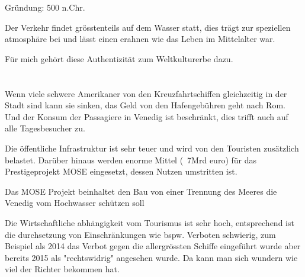 \documentclass[12pt, letterpaper, twoside]{article}
\begin{document}
\begin{flushleft}
Gründung: 500 n.Chr.

Der Verkehr findet grösstenteils auf dem Wasser statt, dies trägt zur speziellen
atmosphäre bei und lässt einen erahnen wie das Leben im Mittelalter war.

Für mich gehört diese Authentizität zum Weltkulturerbe dazu.


\section{}
Wenn viele schwere Amerikaner von den Kreuzfahrtschiffen gleichzeitig in der Stadt sind kann sie sinken,
das Geld von den Hafengebühren geht nach Rom. Und der Konsum der Passagiere in Venedig ist beschränkt,
dies trifft auch auf alle Tagesbesucher zu.


Die öffentliche Infrastruktur ist sehr teuer und wird von den Touristen zusätzlich belastet. Darüber
hinaus werden enorme Mittel (~7Mrd euro) für das Prestigeprojekt MOSE eingesetzt, dessen Nutzen umstritten ist.

Das MOSE Projekt beinhaltet den Bau von einer Trennung des Meeres die Venedig vom Hochwasser schützen soll

Die Wirtschaftliche abhängigkeit vom Tourismus ist sehr hoch, entsprechend ist die durchsetzung von
Einschränkungen wie bspw. Verboten schwierig, zum Beispiel als 2014 das Verbot gegen die allergrössten
Schiffe eingeführt wurde aber bereits 2015 als "rechtswidrig" angesehen wurde. Da kann man sich wundern
wie viel der Richter bekommen hat.


\end{flushleft}
\end{document}
